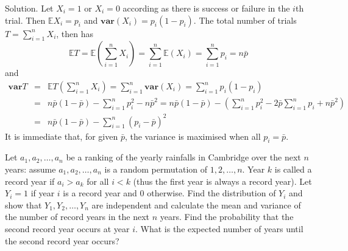 Solution. Let $X_i=1$ or $X_i=0$ according as there is success or failure in the $i$th trial. Then $\mathbb{E}X_i=p_i$ and $\mathbf{var}(X_i)=p_i(1-p_i)$. The total number of trials $T=\sum^n_{i=1}X_i$, then has 
\begin{equation}
\mathbb{E}T = \mathbb{E}\left(\sum^n_{i=1}X_i\right) = \sum^n_{i=1}\mathbb{E}\left(X_i\right) = \sum^n_{i=1}p_i=n\bar{p}
\end{equation}
and
\begin{eqnarray}
\mathbf{var}T & = & \mathbb{E}T\left(\sum^n_{i=1}X_i\right) =  \sum^n_{i=1}\mathbf{var}\left(X_i\right) =\sum^n_{i=1}p_i(1-p_i)\nonumber\\
& = & n\bar{p}(1-\bar{p})-\sum^n_{i=1} p_i^2 -n\bar{p}^2 =   n\bar{p}(1-\bar{p})-\left(\sum^n_{i=1} p_i^2 - 2\bar{p}\sum^n_{i=1}p_i+  n\bar{p}^2\right) \nonumber\\
& = & n\bar{p}(1-\bar{p})-\sum^n_{i=1} \left(p_i-\bar{p}\right)^2
\end{eqnarray}
It is immediate that, for given $\bar{p}$, the variance is maximised when all $p_i=\bar{p}$.



\item Let $a_1,a_2,\dots,a_n$ be a ranking of the yearly rainfalls in Cambridge over the next $n$ years: assume $a_1,a_2,\dots,a_n$ is a random permutation of $1,2,\dots,n$. Year $k$ is called a record year if $a_i>a_k$ for all $i<k$ (thus the first year is always a record year). Let $Y_i=1$ if year $i$ is a record year and $0$ otherwise. Find the distribution of $Y_i$ and show that $Y_1,Y_2,\dots,Y_n$ are independent and calculate the mean and variance of the number of record years in the next $n$ years. Find the probability that the second record year occurs at year $i$. What is the expected number of years until the second record year occurs?




